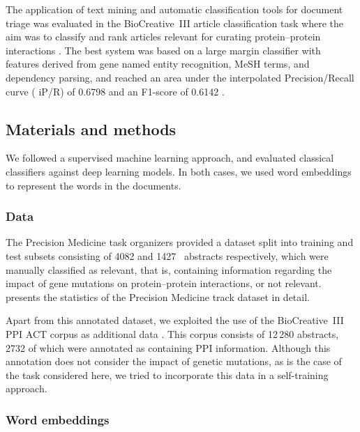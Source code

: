 The application of text mining and automatic classification tools for document triage was evaluated in the BioCreative~III  article classification task where the aim was to classify and rank articles relevant for curating protein--protein interactions \parencite{krallinger2010a,krallinger2011a}.
The best system was based on a large margin classifier with features derived from gene named entity recognition, MeSH terms, and dependency parsing, and reached an area under the interpolated Precision/Recall curve ( iP/R) of 0.6798 and an F1-score of 0.6142 \parencite{kim2011e,kim2011d}.


\subsection{Materials and methods}

We followed a supervised machine learning approach, and evaluated classical classifiers against deep learning models.
In both cases, we used word embeddings to represent the words in the documents.


\subsubsection{Data}

The Precision Medicine task organizers provided a dataset split into training and test subsets consisting of 4082 and 1427~ abstracts respectively, which were manually classified as relevant, that is, containing information regarding the impact of gene mutations on protein--protein interactions, or not relevant.
 presents the statistics of the Precision Medicine track dataset in detail.



Apart from this annotated dataset, we exploited the use of the BioCreative~III PPI ACT corpus as additional data \parencite{krallinger2010a,krallinger2011a}.
This corpus consists of 12\,280  abstracts, 2732 of which were annotated as containing PPI information.
Although this annotation does not consider the impact of genetic mutations, as is the case of the task considered here, we tried to incorporate this data in a self-training approach.


\subsubsection{Word embeddings}

